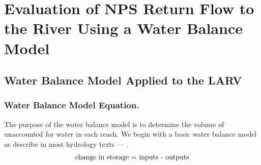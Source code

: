 \renewcommand{\thechapter}{4}
\chapter{Evaluation of NPS Return Flow to the River Using a Water Balance Model}
\label{chap:WaterBalanceModel}

\begin{linenumbers}
\section{Water Balance Model Applied to the LARV}
\label{sec:AppliedWaterModel}

\subsection*{Water Balance Model Equation.}
The purpose of the water balance model is to determine the volume of unaccounted for water in each reach.  We begin with a basic water balance model as describe in most hydrology texts --- \parencite{wanielista1997}.
\begin{equation}
	\textnormal{change in storage = inputs - outputs} \nonumber
\end{equation}


\end{linenumbers}
